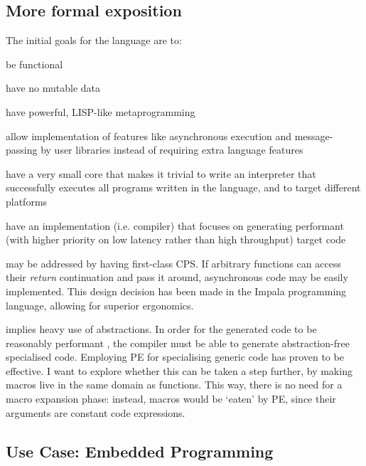 \documentclass[main.tex]{subfiles}
\begin{document}
\subsection{More formal exposition}

The initial goals for the language are to:
\begin{menumerate}
    \item\label{functional} be functional
    \item\label{immutable} have no mutable data
    \item\label{metaprogramming} have powerful, LISP-like metaprogramming
    \item\label{allows-async} allow implementation of features like asynchronous
    execution and message-passing by user libraries instead of requiring
    extra language features
    \item\label{simple} have a very small core that makes it trivial to
    write an interpreter that successfully executes all programs written
    in the language, and to target different platforms
    \item\label{performant} have an implementation (i.e. compiler) that
    focuses on generating performant (with higher priority on low latency rather
    than high throughput) target code
\end{menumerate}

 may be addressed by having first-class CPS.
If arbitrary functions can access their \emph{return} continuation
and pass it around, asynchronous code may be easily implemented.
This design decision has been made in the Impala programming
language\cite{anydsl}, allowing for superior ergonomics.

 implies heavy use of abstractions. In order for the
generated code to be reasonably performant , the compiler
must be able to generate abstraction-free specialised code. Employing PE for
specialising generic code has proven\cite{anydsl} to be effective. I want to
explore whether this can be taken a step further, by making macros live in the
same domain as functions. This way, there is no need for a macro expansion
phase: instead, macros would be `eaten' by PE, since their arguments are
constant code expressions.

\subsection{Use Case: Embedded Programming}
\end{document}
